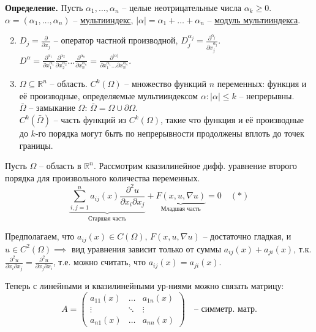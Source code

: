 \documentclass[12pt, a4paper]{article}
\begin{document}
\noindent\textbf{Определение.} Пусть $\alpha_1, \dots, \alpha_n$ -- целые неотрицательные числа $\alpha_k \ge 0$. $\alpha = (\alpha_1, \dots, \alpha_n)$ -- \underline{мультииндекс}, $|\alpha| = \alpha_1 + \dots + \alpha_n$ -- \underline{модуль мультииндекса}.

\begin{enumerate}
    \setcounter{enumi}{1} %
    \item $D_j = \frac{\partial}{\partial x_j}$ -- оператор частной производной, $D_j^{\alpha_j} = \frac{\partial^{\alpha_j}}{\partial x_j^{\alpha_j}}$.\\
    $D^\alpha = \frac{\partial^{\alpha_1}}{\partial x_1^{\alpha_1}} \frac{\partial^{\alpha_2}}{\partial x_2^{\alpha_2}} \dots \frac{\partial^{\alpha_n}}{\partial x_n^{\alpha_n}} = \frac{\partial^{|\alpha|}}{\partial x_1^{\alpha_1} \dots \partial x_n^{\alpha_n}}$.

    \item $\Omega \subseteq \mathbb{R}^n$ -- область. $C^k(\Omega)$ -- множество функций $n$ переменных: функция и её производные, определяемые мультииндексом $\alpha: |\alpha| \le k$ -- непрерывны. \\
    $\bar{\Omega}$ -- замыкание $\Omega$: $\bar{\Omega} = \Omega \cup \partial \Omega$. \\
    $C^k(\bar{\Omega})$ -- часть функций из $C^k(\Omega)$, такие что функция и её производные до $k$-го порядка могут быть по непрерывности продолжены вплоть до точек границы.
\end{enumerate}

\noindent Пусть $\Omega$ -- область в $\mathbb{R}^n$. Рассмотрим квазилинейное дифф. уравнение второго порядка для произвольного количества переменных.
\[
\underbrace{\sum_{i,j=1}^n a_{ij}(x) \frac{\partial^2 u}{\partial x_i \partial x_j}}_{\text{Старшая часть}} + \underbrace{F(x, u, \nabla u)}_{\text{Младшая часть}} = 0 \quad (*)
\]

\hfill {} %







Предполагаем, что $a_{ij}(x) \in C(\Omega)$, $F(x, u, \nabla u)$ -- достаточно гладкая, и $u \in C^2(\Omega) \implies$ вид уравнения зависит только от суммы $a_{ij}(x) + a_{ji}(x)$, т.к. $\frac{\partial^2 u}{\partial x_i \partial x_j} = \frac{\partial^2 u}{\partial x_j \partial x_i}$, т.е. можно считать, что $a_{ij}(x) = a_{ji}(x)$.

Теперь с линейными и квазилинейными ур-ниями можно связать матрицу:
\[
A = \begin{pmatrix}
a_{11}(x) & \dots & a_{1n}(x) \\
\vdots & \ddots & \vdots \\
a_{n1}(x) & \dots & a_{nn}(x)
\end{pmatrix} \quad \text{-- симметр. матр.}
\]
\end{document}
